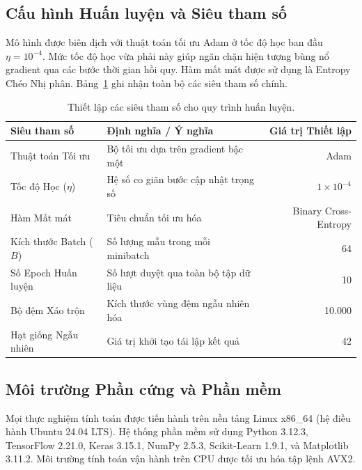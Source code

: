 \documentclass[11pt,a4paper]{article}
\begin{document}
\subsection{Cấu hình Huấn luyện và Siêu tham số}
Mô hình được biên dịch với thuật toán tối ưu Adam ở tốc độ học ban đầu $\eta = 10^{-4}$. Mức tốc độ học vừa phải này giúp ngăn chặn hiện tượng bùng nổ gradient qua các bước thời gian hồi quy. Hàm mất mát được sử dụng là Entropy Chéo Nhị phân. Bảng~\ref{tab:hyperparams} ghi nhận toàn bộ các siêu tham số chính.

\begin{table}[H]
\centering
\begin{tabular}{llr}
\toprule
\textbf{Siêu tham số} & \textbf{Định nghĩa / Ý nghĩa} & \textbf{Giá trị Thiết lập} \\
\midrule
Thuật toán Tối ưu      & Bộ tối ưu dựa trên gradient bậc một & Adam \\
Tốc độ Học ($\eta$)    & Hệ số co giãn bước cập nhật trọng số & $1 \times 10^{-4}$ \\
Hàm Mất mát            & Tiêu chuẩn tối ưu hóa & Binary Cross-Entropy \\
Kích thước Batch ($B$) & Số lượng mẫu trong mỗi minibatch & 64 \\
Số Epoch Huấn luyện    & Số lượt duyệt qua toàn bộ tập dữ liệu & 10 \\
Bộ đệm Xáo trộn        & Kích thước vùng đệm ngẫu nhiên hóa & 10.000 \\
Hạt giống Ngẫu nhiên   & Giá trị khởi tạo tái lập kết quả & 42 \\
\bottomrule
\end{tabular}
\caption{Thiết lập các siêu tham số cho quy trình huấn luyện.}
\label{tab:hyperparams}
\end{table}

\subsection{Môi trường Phần cứng và Phần mềm}
Mọi thực nghiệm tính toán được tiến hành trên nền tảng Linux x86\_64 (hệ điều hành Ubuntu 24.04 LTS). Hệ thống phần mềm sử dụng Python 3.12.3, TensorFlow 2.21.0, Keras 3.15.1, NumPy 2.5.3, Scikit-Learn 1.9.1, và Matplotlib 3.11.2. Môi trường tính toán vận hành trên CPU được tối ưu hóa tập lệnh AVX2.
\end{document}
